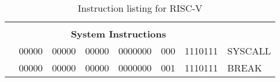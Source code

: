 \begin{table}[p]
\begin{small}
\begin{center}
\begin{tabular}{rccccccccccl}
&
\multicolumn{10}{c}{} & \\
&
\multicolumn{10}{c}{\bf System Instructions} & \\
\cline{2-11}
  

&
\multicolumn{1}{|c|}{00000} &
\multicolumn{1}{c|}{00000} &
\multicolumn{1}{c|}{00000} &
\multicolumn{4}{c|}{0000000} &
\multicolumn{2}{c|}{000} &
\multicolumn{1}{c|}{1110111} & SYSCALL  \\
\cline{2-11}
  

&
\multicolumn{1}{|c|}{00000} &
\multicolumn{1}{c|}{00000} &
\multicolumn{1}{c|}{00000} &
\multicolumn{4}{c|}{0000000} &
\multicolumn{2}{c|}{001} &
\multicolumn{1}{c|}{1110111} & BREAK  \\
\cline{2-11}
  

\end{tabular}
\end{center}
\end{small}
\caption{Instruction listing for RISC-V}
\label{instr-table}
\end{table}
  
